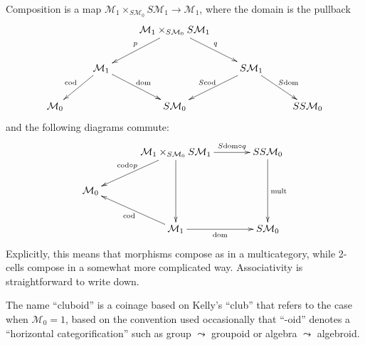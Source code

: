 \documentclass{amsart}
\theoremstyle{definition}
\def\M{\mathcal{M}}
\begin{document}
Composition is a map $\M_1 \times_{S\M_0} S\M_1 \to \M_1$, where the domain is the pullback
\[ \xymatrix { && \M_1 \times_{S\M_0} S\M_1 \ar[dl]_p \ar[dr]^q\\
  & \M_1 \ar[dl]_{\mathrm{cod}} \ar[dr]^{\mathrm{dom}} &&
  S\M_1  \ar[dl]_{S\mathrm{cod}} \ar[dr]^{S\mathrm{dom}} \\
  \M_0 && S\M_0 && SS\M_0} \]
and the following diagrams commute:
\[ \xymatrix@C=3pc{ & \M_1 \times_{S\M_0} S\M_1 \ar[dl]_{\mathrm{cod} \circ p} \ar[r]^-{S\mathrm{dom} \circ q} \ar[dd]&
  SS\M_0 \ar[dd]^{\mathrm{mult}} \\
  \M_0 \\
  & \M_1 \ar[ul]^{\mathrm{cod}} \ar[r]_-{\mathrm{dom}} & S \M_0} \]
Explicitly, this means that morphisms compose as in a multicategory, while 2-cells compose in a somewhat more complicated way.
Associativity is straightforward to write down.

The name ``cluboid'' is a coinage based on Kelly's ``club'' that refers to the case when $\M_0=1$, based on the convention used occasionally that ``-oid'' denotes a ``horizontal categorification'' such as group $\leadsto$ groupoid or algebra $\leadsto$ algebroid.
\end{document}
